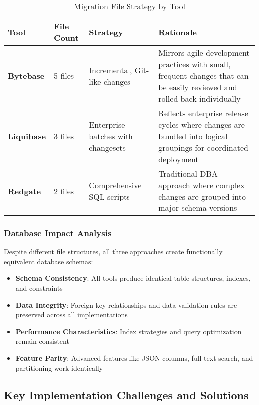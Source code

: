 \documentclass[11pt,a4paper]{article}
\begin{document}
\begin{table}[H]
\centering
\caption{Migration File Strategy by Tool}
\begin{tabular}{|p{3cm}|p{2cm}|p{5cm}|p{4cm}|}
\hline
\textbf{Tool} & \textbf{File Count} & \textbf{Strategy} & \textbf{Rationale} \\
\hline
\textbf{\textcolor{bytebase}{Bytebase}} & 5 files & Incremental, Git-like changes & 
Mirrors agile development practices with small, frequent changes that can be easily reviewed and rolled back individually \\
\hline
\textbf{\textcolor{liquibase}{Liquibase}} & 3 files & Enterprise batches with changesets & 
Reflects enterprise release cycles where changes are bundled into logical groupings for coordinated deployment \\
\hline
\textbf{\textcolor{redgate}{Redgate}} & 2 files & Comprehensive SQL scripts & 
Traditional DBA approach where complex changes are grouped into major schema versions \\
\hline
\end{tabular}
\end{table}

\subsubsection{Database Impact Analysis}

Despite different file structures, all three approaches create functionally equivalent database schemas:

\begin{itemize}
\item \textbf{Schema Consistency}: All tools produce identical table structures, indexes, and constraints
\item \textbf{Data Integrity}: Foreign key relationships and data validation rules are preserved across all implementations
\item \textbf{Performance Characteristics}: Index strategies and query optimization remain consistent
\item \textbf{Feature Parity}: Advanced features like JSON columns, full-text search, and partitioning work identically
\end{itemize}

\subsection{Key Implementation Challenges and Solutions}
\end{document}
